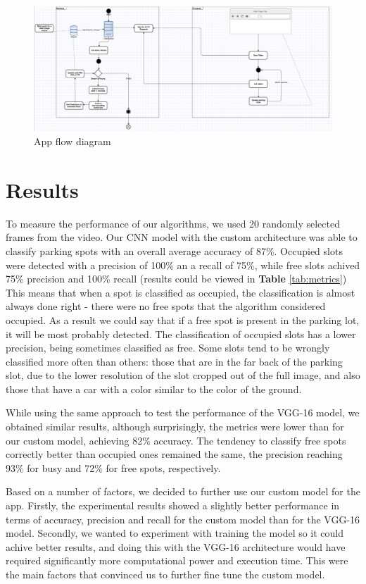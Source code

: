 \documentclass[runningheads,a4paper,11pt]{report}
\begin{document}
\begin{figure}[htbp]
	\centerline{\includegraphics[width=18cm]{images/flow}}   
	\caption{App flow diagram}
	\label{fig:flowimg}
\end{figure}

\section{Results}
\label{section:results}

To measure the performance of our algorithms, we used 20 randomly selected frames from the video. Our CNN model with the custom architecture was able to classify parking spots with an overall average accuracy of 87\%. Occupied slots were detected with a precision of 100\% an a recall of 75\%, while free slots achived 75\% precision and 100\% recall (results could be viewed in \textbf{Table} \ref{tab:metrics}) This means that when a spot is classified as occupied, the classification is almost always done right - there were no free spots that the algorithm considered occupied. As a result we could say that if a free spot is present in the parking lot, it will be most probably detected. The classification of occupied slots has a lower precision, being sometimes classified as free. Some slots tend to be wrongly classified more often than others: those that are in the far back of the parking slot, due to the lower resolution of the slot cropped out of the full image, and also those that have a car with a color similar to the color of the ground.

While using the same approach to test the performance of the VGG-16 model, we obtained similar results, although surprisingly, the metrics were lower than for our custom model, achieving 82\% accuracy. The tendency to classify free spots correctly better than occupied ones remained the same, the precision reaching 93\% for busy and 72\% for free spots, respectively. 

Based on a number of factors, we decided to further use our custom model for the app. Firstly, the experimental results showed a slightly better performance in terms of accuracy, precision and recall for the custom model than for the VGG-16 model. Secondly, we wanted to experiment with training the model so it could achive better results, and doing this with the VGG-16 architecture would have required significantly more computational power and execution time. This were the main factors that convinced us to further fine tune the custom model.
\end{document}
